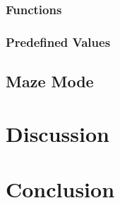 \documentclass[12pt, a4paper]{article}
\begin{document}
\subsubsection{Functions}

\subsubsection{Predefined Values}

\subsection{Maze Mode}

\newpage

\section{Discussion}

\section{Conclusion}
\end{document}
